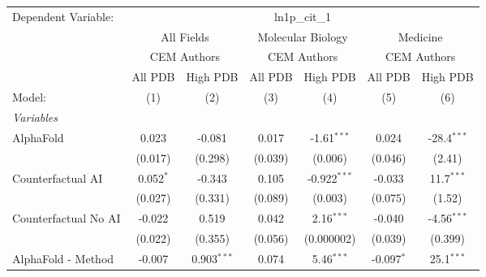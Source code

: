 \begingroup
\centering
\begin{tabular}{lcccccc}
   \tabularnewline \midrule \midrule
   Dependent Variable: & \multicolumn{6}{c}{ln1p\_cit\_1}\\
 & \multicolumn{2}{c}{All Fields} & \multicolumn{2}{c}{Molecular Biology} & \multicolumn{2}{c}{Medicine} \\
\cmidrule(lr){2-3} \cmidrule(lr){4-5} \cmidrule(lr){6-7}
 & \multicolumn{2}{c}{CEM Authors} & \multicolumn{2}{c}{CEM Authors} & \multicolumn{2}{c}{CEM Authors} \\
\cmidrule(lr){2-3} \cmidrule(lr){4-5} \cmidrule(lr){6-7}
 & \multicolumn{1}{c}{All PDB} & \multicolumn{1}{c}{High PDB} & \multicolumn{1}{c}{All PDB} & \multicolumn{1}{c}{High PDB} & \multicolumn{1}{c}{All PDB} & \multicolumn{1}{c}{High PDB} \\
\cmidrule(lr){2-2} \cmidrule(lr){3-3} \cmidrule(lr){4-4} \cmidrule(lr){5-5} \cmidrule(lr){6-6} \cmidrule(lr){7-7}
   Model:                                                     & (1)            & (2)           & (3)            & (4)            & (5)          & (6)\\  
   \midrule
   \emph{Variables}\\
   AlphaFold                                                  & 0.023          & -0.081        & 0.017          & -1.61$^{***}$  & 0.024        & -28.4$^{***}$\\   
                                                              & (0.017)        & (0.298)       & (0.039)        & (0.006)        & (0.046)      & (2.41)\\   
   Counterfactual AI                                          & 0.052$^{*}$    & -0.343        & 0.105          & -0.922$^{***}$ & -0.033       & 11.7$^{***}$\\   
                                                              & (0.027)        & (0.331)       & (0.089)        & (0.003)        & (0.075)      & (1.52)\\   
   Counterfactual No AI                                       & -0.022         & 0.519         & 0.042          & 2.16$^{***}$   & -0.040       & -4.56$^{***}$\\   
                                                              & (0.022)        & (0.355)       & (0.056)        & (0.000002)     & (0.039)      & (0.399)\\   
   AlphaFold - Method                                         & -0.007         & 0.903$^{***}$ & 0.074          & 5.46$^{***}$   & -0.097$^{*}$ & 25.1$^{***}$\\   

\end{tabular}
